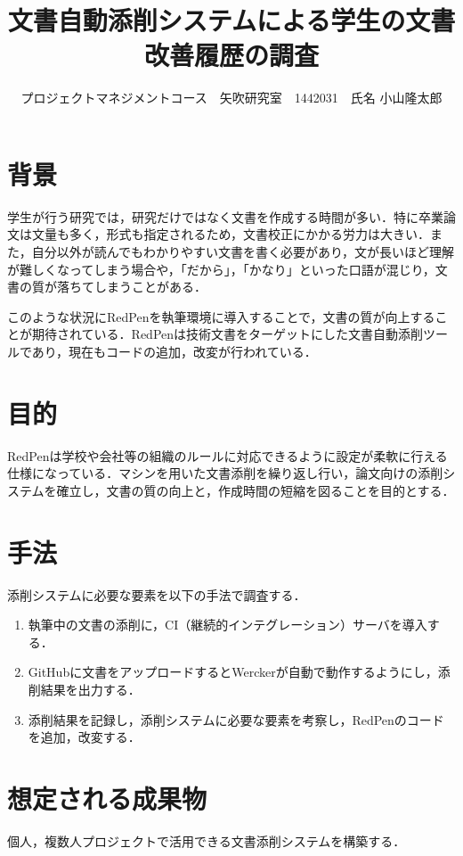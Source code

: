 \documentclass[uplatex,twocolumn,dvipdfmx]{jsarticle}
\title{\vspace{-5mm}\fontsize{14pt}{0pt}\selectfont 文書自動添削システムによる学生の文書改善履歴の調査}
\author{\normalsize プロジェクトマネジメントコース　矢吹研究室　1442031　氏名 小山隆太郎}
\date{}
\begin{document}
\fontsize{10.5pt}{\baselineskip}\selectfont
\maketitle





\section{背景}
学生が行う研究では，研究だけではなく文書を作成する時間が多い．特に卒業論文は文量も多く，形式も指定されるため，文書校正にかかる労力は大きい．また，自分以外が読んでもわかりやすい文書を書く必要があり，文が長いほど理解が難しくなってしまう場合や，「だから」，「かなり」といった口語が混じり，文書の質が落ちてしまうことがある．

このような状況にRedPen\cite{a}を執筆環境に導入することで，文書の質が向上することが期待されている．RedPenは技術文書をターゲットにした文書自動添削ツールであり，現在もコードの追加，改変が行われている．

\section{目的}
RedPenは学校や会社等の組織のルールに対応できるように設定が柔軟に行える仕様になっている．マシンを用いた文書添削を繰り返し行い，論文向けの添削システムを確立し，文書の質の向上と，作成時間の短縮を図ることを目的とする．

\section{手法}
添削システムに必要な要素を以下の手法で調査する．

\begin{enumerate}
 \item 執筆中の文書の添削に，CI（継続的インテグレーション）サーバを導入する\cite{b}．
 \item GitHubに文書をアップロードするとWerckerが自動で動作するようにし，添削結果を出力する．
 \item 添削結果を記録し，添削システムに必要な要素を考察し，RedPenのコードを追加，改変する．
\end{enumerate}

\section{想定される成果物}
個人，複数人プロジェクトで活用できる文書添削システムを構築する．
\end{document}
